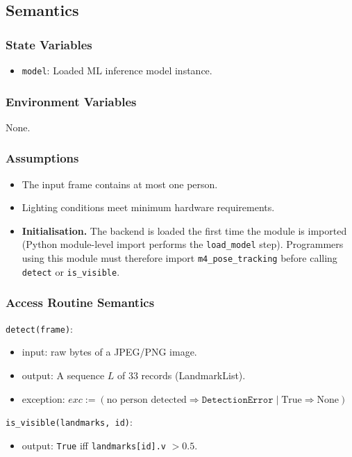 \documentclass[12pt, titlepage]{article}
\begin{document}
\subsection{Semantics}

\subsubsection{State Variables}
\begin{itemize}
  \item \texttt{model}: Loaded ML inference model instance.
\end{itemize}

\subsubsection{Environment Variables}
None.

\subsubsection{Assumptions}
\begin{itemize}
  \item The input frame contains at most one person.
  \item Lighting conditions meet minimum hardware requirements.
  \item \textbf{Initialisation.} The backend is loaded the first time
    the module is imported (Python module-level import performs the
    \texttt{load\_model} step). Programmers using this module must
    therefore import \texttt{m4\_pose\_tracking} before calling
    \texttt{detect} or \texttt{is\_visible}.
\end{itemize}

\subsubsection{Access Routine Semantics}

\noindent \texttt{detect(frame)}:
\begin{itemize}
  \item input: raw bytes of a JPEG/PNG image.
  \item output: A sequence $L$ of 33 records (LandmarkList).
  \item exception: $exc := (\text{no person detected} \Rightarrow \texttt{DetectionError} \mid \text{True} \Rightarrow \text{None})$
\end{itemize}

\noindent \texttt{is\_visible(landmarks, id)}:
\begin{itemize}
  \item output: \texttt{True} iff \texttt{landmarks[id].v} $> 0.5$.
\end{itemize}
\end{document}

